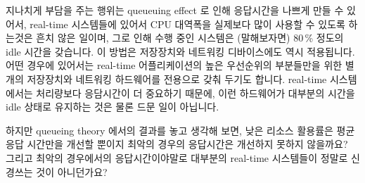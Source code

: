 지나치게 부담을 주는 행위는 queueuing effect 로 인해 응답시간을 나쁘게 만들 수
있어서, real-time 시스템들에 있어서 CPU 대역폭을 실제보다 많이 사용할 수 있도록
하는것은 흔치 않은 일이며, 그로 인해 수행 중인 시스템은 (말해보자면) 80\,\%
정도의 idle 시간을 갖습니다.
이 방법은 저장장치와 네트워킹 디바이스에도 역시 적용됩니다.
어떤 경우에 있어서는 real-time 어플리케이션의 높은 우선순위의 부분들만을 위한
별개의 저장장치와 네트워킹 하드웨어를 전용으로 갖춰 두기도 합니다.
real-time 시스템에서는 처리량보다 응담시간이 더 중요하기 때문에, 이런
하드웨어가 대부분의 시간을 idle 상태로 유지하는 것은 물론 드문 일이 아닙니다.

\QuickQuiz{}
	하지만 queueing theory 에서의 결과를 놓고 생각해 보면, 낮은 리소스
	활용률은 평균 응답 시간만을 개선할 뿐이지 최악의 경우의 응답시간은
	개선하지 못하지 않을까요?
	그리고 최악의 경우에서의 응답시간이야말로 대부분의 real-time 시스템들이
	정말로 신경쓰는 것이 아니던가요?
	\iffalse

